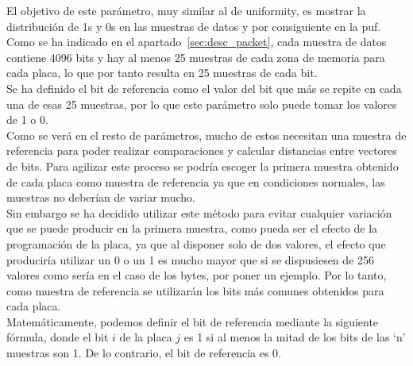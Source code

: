 \documentclass[spanish]{template/minim}
\begin{document}
\begin{figure}[H]
%

\end{figure}

El objetivo de este parámetro, muy similar al de uniformity, es mostrar la distribución de 1s y 0s en las muestras de datos y por consiguiente en la \gls{puf}.\\

Como se ha indicado en el apartado~\ref{sec:desc_packet}, cada muestra de datos contiene 4096 bits y hay al menos 25 muestras de cada zona de memoria para cada placa, lo que por tanto resulta en 25 muestras de cada bit.\\

Se ha definido el bit de referencia como el valor del bit que más se repite en cada una de esas 25 muestras, por lo que este parámetro solo puede tomar los valores de 1 o 0.\\

Como se verá en el resto de parámetros, mucho de estos necesitan una muestra de referencia para poder realizar comparaciones y calcular distancias entre vectores de bits. Para agilizar este proceso se podría escoger la primera muestra obtenido de cada placa como muestra de referencia ya que en condiciones normales, las muestras no deberían de variar mucho.\\

Sin embargo se ha decidido utilizar este método para evitar cualquier variación que se puede producir en la primera muestra, como pueda ser el efecto de la programación de la placa, ya que al disponer solo de dos valores, el efecto que produciría utilizar un 0 o un 1 es mucho mayor que si se dispusiesen de 256 valores como sería en el caso de los bytes, por poner un ejemplo. Por lo tanto, como muestra de referencia se utilizarán los bits más comunes obtenidos para cada placa.\\

Matemáticamente, podemos definir el bit de referencia mediante la siguiente fórmula, donde el bit $i$ de la placa $j$ es 1 si al menos la mitad de los bits de las `n' muestras son 1. De lo contrario, el bit de referencia es 0.\\
\end{document}

